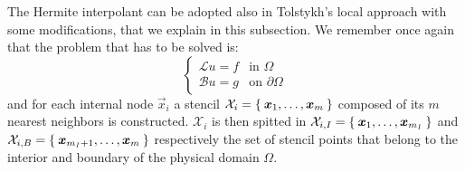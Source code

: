The Hermite interpolant can be adopted also in Tolstykh's local approach with some modifications, that we explain in this subsection.
We remember once again that the problem that has to be solved is:
\begin{equation}
	\label{eqn:boundary_value_problem_RBF-HFD}
	\begin{cases}
		\mathcal{L} u  = f 		 & \text{in $\Omega$} \\
		\mathcal{B} u   = g	     & \text{on $\partial\Omega$}
	\end{cases}
\end{equation}
and for each internal node $\vec{x}_i$ a stencil $\mathcal{X}_i = \Set{\boldsymbol{x}_1, \dots, \boldsymbol{x}_m}$ composed of its $m$ nearest neighbors is constructed. $\mathcal{X}_i$ is then spitted in $\mathcal{X}_{i,I} = \Set{\boldsymbol{x}_1, \dots, \boldsymbol{x}_{m_I}}$ and $\mathcal{X}_{i,B} = \Set{\boldsymbol{x}_{m_I+1}, \dots, \boldsymbol{x}_{m}}$ respectively the set of stencil points that belong to the interior and boundary of the physical domain $\Omega$.

